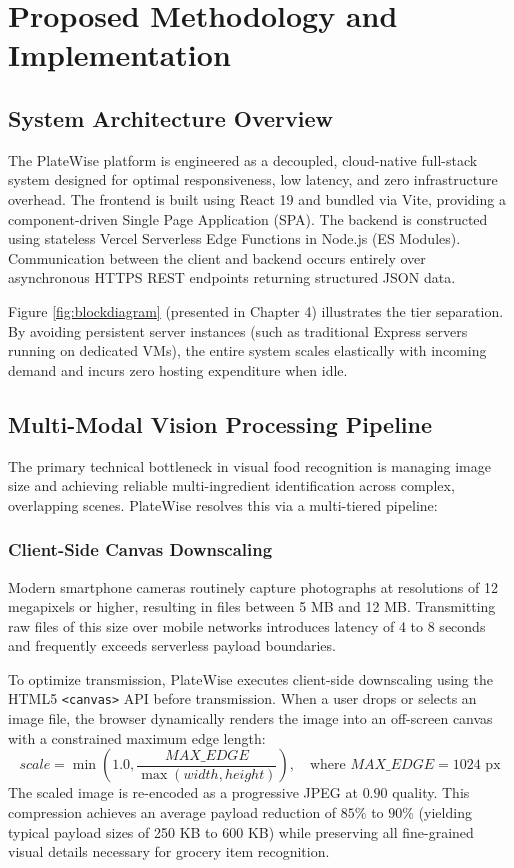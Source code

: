 \chapter{Proposed Methodology and Implementation}

\section{System Architecture Overview}
The PlateWise platform is engineered as a decoupled, cloud-native full-stack system designed for optimal responsiveness, low latency, and zero infrastructure overhead. The frontend is built using React 19 and bundled via Vite, providing a component-driven Single Page Application (SPA). The backend is constructed using stateless Vercel Serverless Edge Functions in Node.js (ES Modules). Communication between the client and backend occurs entirely over asynchronous HTTPS REST endpoints returning structured JSON data.

Figure \ref{fig:blockdiagram} (presented in Chapter 4) illustrates the tier separation. By avoiding persistent server instances (such as traditional Express servers running on dedicated VMs), the entire system scales elastically with incoming demand and incurs zero hosting expenditure when idle.

\section{Multi-Modal Vision Processing Pipeline}
The primary technical bottleneck in visual food recognition is managing image size and achieving reliable multi-ingredient identification across complex, overlapping scenes. PlateWise resolves this via a multi-tiered pipeline:

\subsection*{Client-Side Canvas Downscaling}
Modern smartphone cameras routinely capture photographs at resolutions of 12 megapixels or higher, resulting in files between 5 MB and 12 MB. Transmitting raw files of this size over mobile networks introduces latency of 4 to 8 seconds and frequently exceeds serverless payload boundaries.

To optimize transmission, PlateWise executes client-side downscaling using the HTML5 \texttt{<canvas>} API before transmission. When a user drops or selects an image file, the browser dynamically renders the image into an off-screen canvas with a constrained maximum edge length:
\begin{equation}
scale = \min\left(1.0, \frac{MAX\_EDGE}{\max(width, height)}\right), \quad \text{where } MAX\_EDGE = 1024\text{ px}
\end{equation}
The scaled image is re-encoded as a progressive JPEG at $0.90$ quality. This compression achieves an average payload reduction of $85\%$ to $90\%$ (yielding typical payload sizes of 250 KB to 600 KB) while preserving all fine-grained visual details necessary for grocery item recognition.

